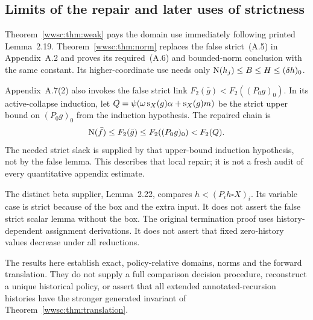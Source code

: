 \subsection{Limits of the repair and later uses of strictness}

Theorem~\ref{wwsc:thm:weak} pays the domain use immediately following printed
Lemma~2.19. Theorem~\ref{wwsc:thm:norm} replaces the false strict~(A.5) in
Appendix~A.2 and proves its required~(A.6) and bounded-norm conclusion
with the same constant. Its higher-coordinate use needs only
$\operatorname{N}(h_j)\le B\le H\le(\delta h)_0$.

Appendix~A.7(2) also invokes the false strict link
$F_2(\bar g)<F_2((P_0g)_0)$. In its active-collapse induction, let
$Q=\psi(\omega\operatorname{s}_X(g)\alpha+\operatorname{s}_X(g)m)$ be the strict upper bound
on $(P_0g)_0$ from the induction hypothesis. The repaired chain is
\[
 \operatorname{N}(\bar f)\le F_2(\bar g)
       \le F_2((P_0g)_0)<F_2(Q).
\]
The needed strict slack is supplied by that upper-bound induction
hypothesis, not by the false lemma. This describes that local repair;
it is not a fresh audit of every quantitative appendix estimate.

The distinct beta supplier, Lemma~2.22, compares
$h<(P_i h\square X)_i$. Its variable case is strict because of the
box and the extra input. It does not assert the false strict scalar
lemma without the box. The original termination proof uses
history-dependent assignment derivations. It does not assert that
fixed zero-history values decrease under all reductions.

The results here establish exact, policy-relative domains, norms and
the forward translation. They do not supply a full comparison decision
procedure, reconstruct a unique historical policy, or assert that all
extended annotated-recursion histories have the stronger generated
invariant of Theorem~\ref{wwsc:thm:translation}.


\endgroup
